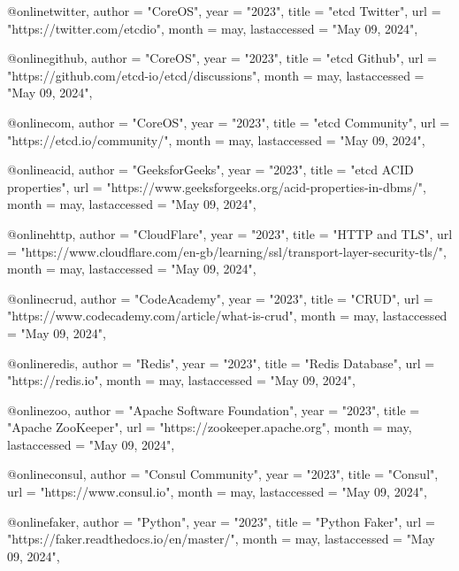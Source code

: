 @online{twitter,
  author =       "CoreOS",
  year =         "2023",
  title =        "etcd Twitter",
  url =          "https://twitter.com/etcdio",
  month =        may,
  lastaccessed = "May 09, 2024",
}

@online{github,
  author =       "CoreOS",
  year =         "2023",
  title =        "etcd Github",
  url =          "https://github.com/etcd-io/etcd/discussions",
  month =        may,
  lastaccessed = "May 09, 2024",
}

@online{com,
  author =       "CoreOS",
  year =         "2023",
  title =        "etcd Community",
  url =          "https://etcd.io/community/",
  month =        may,
  lastaccessed = "May 09, 2024",
}

@online{acid,
  author =       "GeeksforGeeks",
  year =         "2023",
  title =        "etcd ACID properties",
  url =          "https://www.geeksforgeeks.org/acid-properties-in-dbms/",
  month =        may,
  lastaccessed = "May 09, 2024",
}

@online{http,
  author =       "CloudFlare",
  year =         "2023",
  title =        "HTTP and TLS",
  url =          "https://www.cloudflare.com/en-gb/learning/ssl/transport-layer-security-tls/",
  month =        may,
  lastaccessed = "May 09, 2024",
}

@online{crud,
  author =       "CodeAcademy",
  year =         "2023",
  title =        "CRUD",
  url =          "https://www.codecademy.com/article/what-is-crud",
  month =        may,
  lastaccessed = "May 09, 2024",
}

@online{redis,
  author =       "Redis",
  year =         "2023",
  title =        "Redis Database",
  url =          "https://redis.io",
  month =        may,
  lastaccessed = "May 09, 2024",
}

@online{zoo,
  author =       "Apache Software Foundation",
  year =         "2023",
  title =        "Apache ZooKeeper",
  url =          "https://zookeeper.apache.org",
  month =        may,
  lastaccessed = "May 09, 2024",
}

@online{consul,
  author =       "Consul Community",
  year =         "2023",
  title =        "Consul",
  url =          "https://www.consul.io",
  month =        may,
  lastaccessed = "May 09, 2024",
}

@online{faker,
  author =       "Python",
  year =         "2023",
  title =        "Python Faker",
  url =          "https://faker.readthedocs.io/en/master/",
  month =        may,
  lastaccessed = "May 09, 2024",
}
